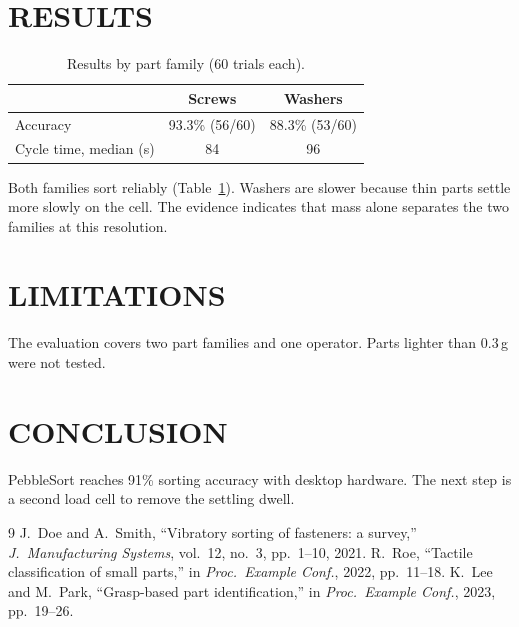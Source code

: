 \documentclass[conference]{IEEEtran}
\begin{document}
\section{RESULTS}
\begin{table}[t]
  \caption{Results by part family (60 trials each).}
  \label{tab:results}
  \centering
  \begin{tabular}{@{}lcc@{}}
    \toprule
     & Screws & Washers \\
    \midrule
    Accuracy & 93.3\% (56/60) & 88.3\% (53/60) \\
    Cycle time, median (s) & 84 & 96 \\
    \bottomrule
  \end{tabular}
\end{table}
Both families sort reliably (Table~\ref{tab:results}). Washers are slower
because thin parts settle more slowly on the cell. The evidence indicates that
mass alone separates the two families at this resolution.

\section{LIMITATIONS}
The evaluation covers two part families and one operator. Parts lighter than
0.3\,g were not tested.

\section{CONCLUSION}
PebbleSort reaches 91\% sorting accuracy with desktop hardware. The next step
is a second load cell to remove the settling dwell.

\begin{thebibliography}{9}
J.~Doe and A.~Smith, ``Vibratory sorting of fasteners: a survey,'' \emph{J.\
Manufacturing Systems}, vol.~12, no.~3, pp.~1--10, 2021.
R.~Roe, ``Tactile classification of small parts,'' in \emph{Proc.\ Example
Conf.}, 2022, pp.~11--18.
K.~Lee and M.~Park, ``Grasp-based part identification,'' in \emph{Proc.\
Example Conf.}, 2023, pp.~19--26.
\end{thebibliography}
\end{document}
